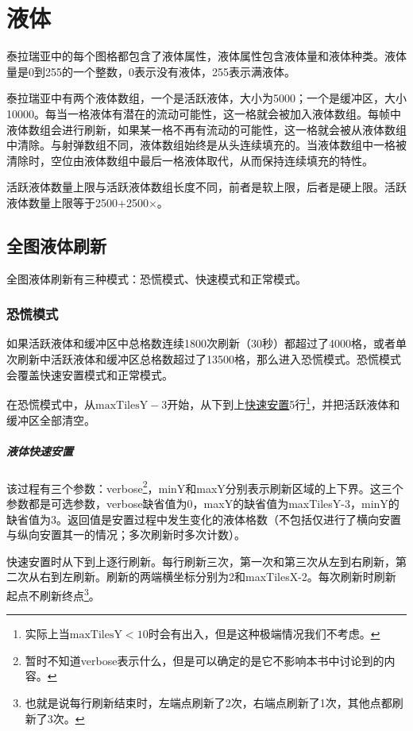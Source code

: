 \chapter{液体}\label{app23}

泰拉瑞亚中的每个图格都包含了液体属性，液体属性包含液体量和液体种类。液体量是0到255的一个整数，0表示没有液体，255表示满液体。

泰拉瑞亚中有两个液体数组，一个是活跃液体，大小为5000；一个是缓冲区，大小10000。每当一格液体有潜在的流动可能性，这一格就会被加入液体数组。每帧中液体数组会进行刷新，如果某一格不再有流动的可能性，这一格就会被从液体数组中清除。与射弹数组不同，液体数组始终是从头连续填充的。当液体数组中一格被清除时，空位由液体数组中最后一格液体取代，从而保持连续填充的特性。

活跃液体数量上限与活跃液体数组长度不同，前者是软上限，后者是硬上限。活跃液体数量上限等于2500+2500$\times$。

\section{全图液体刷新}
全图液体刷新有三种模式：恐慌模式、快速模式和正常模式。

\subsection{恐慌模式}
如果活跃液体和缓冲区中总格数连续1800次刷新（30秒）都超过了4000格，或者单次刷新中活跃液体和缓冲区总格数超过了13500格，那么进入恐慌模式。恐慌模式会覆盖快速安置模式和正常模式。

在恐慌模式中，从$\textrm{maxTilesY}-3$开始，从下到上\hyperref[app30]{快速安置}5行\footnote{实际上当$\textrm{maxTilesY}<10$时会有出入，但是这种极端情况我们不考虑。}，并把活跃液体和缓冲区全部清空。

\paragraph*{液体快速安置}\label{app30}
该过程有三个参数：verbose\footnote{暂时不知道verbose表示什么，但是可以确定的是它不影响本书中讨论到的内容。}，minY和maxY分别表示刷新区域的上下界。这三个参数都是可选参数，verbose缺省值为0，maxY的缺省值为maxTilesY-3，minY的缺省值为3。返回值是安置过程中发生变化的液体格数（不包括仅进行了横向安置与纵向安置其一的情况；多次刷新时多次计数）。

快速安置时从下到上逐行刷新。每行刷新三次，第一次和第三次从左到右刷新，第二次从右到左刷新。刷新的两端横坐标分别为2和maxTilesX-2。每次刷新时刷新起点不刷新终点\footnote{也就是说每行刷新结束时，左端点刷新了2次，右端点刷新了1次，其他点都刷新了3次。}。

